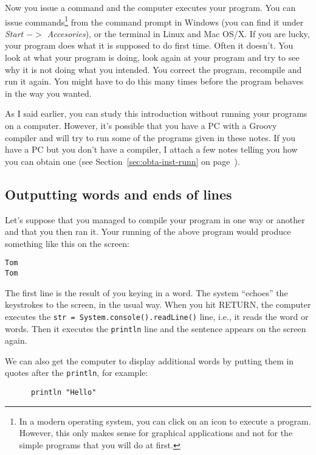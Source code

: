 Now you issue a command and the computer executes
your program. You can issue commands\footnote{In
    a modern operating system, you can click on an icon to execute a
    program. However, this only makes sense for graphical applications
    and not for the simple programs that you will do at first.}
from the command prompt in Windows (you can find it under \emph{Start $->$
    Accesories}), or the terminal in Linux and Mac OS/X.  
If you are lucky, your program does what it is supposed
to do first time.  Often it doesn't.  You look at what your program is
doing, look again at your program and try to see why it is not doing what
you intended.  You correct the program, recompile and run it again.
You might have to do this many times before the program behaves in the way
you wanted.

As I said earlier, you can study this introduction without running your
programs on a computer.  However, it's possible that you have a PC with
a Groovy compiler and will try to run some of the programs given in these
notes. 
If you have a PC but you don't have a compiler, I attach a few notes telling
you how you can obtain one (see Section~\ref{sec:obta-inst-runn} on
page~\pageref{sec:obta-inst-runn}).

\subsection{Outputting words and ends of lines}

Let's suppose that you managed to compile your program in one way or
another and that you then ran it.  Your running of the above program
would produce something like this on the screen:

\begin{Verbatim}
Tom
Tom
\end{Verbatim}

The first line is the result of you keying in a word.  The system ``echoes''
the keystrokes to the screen, in the usual way.  When you hit RETURN, the
computer executes the \verb!str = System.console().readLine()! line, 
i.e., it reads the word or words.  Then it
executes the \verb!println! line and the sentence appears on the screen again.

We can also get the computer to display additional words by putting
them in quotes after the \verb!println!, for example:

\begin{Verbatim}
      println "Hello"
\end{Verbatim}

